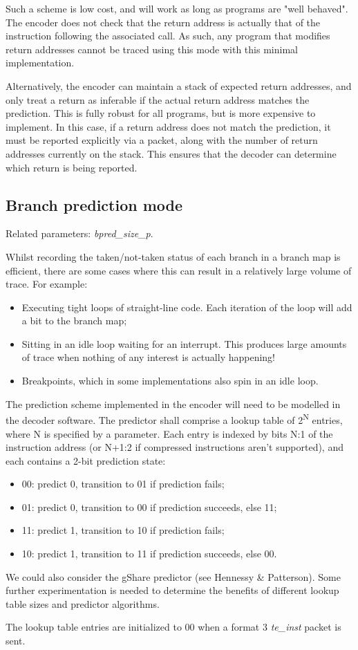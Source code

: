 Such a scheme is low cost, and will work as long as programs are "well behaved".  The encoder does not check that the
return address is actually that of the instruction following the associated call.  As such, any program that
modifies return addresses cannot be traced using this mode with this minimal implementation.

Alternatively, the encoder can maintain a stack of expected return addresses, and only treat a
return as inferable if the actual return address matches the prediction.  This is fully robust for all
programs, but is more expensive to implement.  In this case, if a return address does not match the prediction, 
it must be reported explicitly via a packet, along with the number of return addresses
currently on the stack.  This ensures that the decoder can determine which return is being reported. 

\subsection{Branch prediction mode} \label{sec:branch-prediction}

Related parameters: \textit{bpred\_size\_p}.

Whilst recording the taken/not-taken status of each branch in a branch map is efficient, there are 
some cases where this can result in a relatively large volume of trace.  For example:

\begin{itemize}
  \item Executing tight loops of straight-line code.  Each iteration of the loop will add a bit to the branch map;
  \item Sitting in an idle loop waiting for an interrupt.  This produces large amounts of trace when nothing of 
  any interest is actually happening!  
  \item Breakpoints, which in some implementations also spin in an idle loop.
\end{itemize}

The prediction scheme implemented in the encoder will need to be modelled in the decoder software.  
The predictor shall comprise a lookup table of 2\textsuperscript{N} entries, where N is specified by a parameter.  
Each entry is indexed by bits N:1 of the instruction address (or N+1:2 if compressed instructions aren't supported), 
and each contains a 2-bit prediction state:
\begin{itemize}
  \item 00: predict 0, transition to 01 if prediction fails;
  \item 01: predict 0, transition to 00 if prediction succeeds, else 11;
  \item 11: predict 1, transition to 10 if prediction fails;
  \item 10: predict 1, transition to 11 if prediction succeeds, else 00.
\end{itemize}

We could also consider the gShare predictor (see Hennessy \& Patterson).  Some further experimentation is needed
to determine the benefits of different lookup table sizes and predictor algorithms.

The lookup table entries are initialized to 00 when a format 3 \textit{te\_inst} packet is sent.

